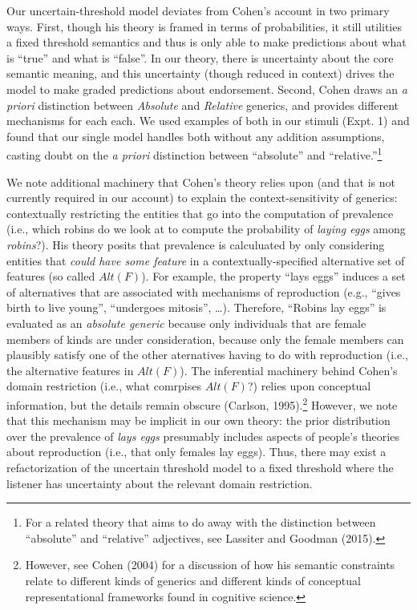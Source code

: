 \documentclass[english,floatsintext,man]{apa6}
\theoremstyle{definition}
\theoremstyle{definition}
\theoremstyle{definition}
\theoremstyle{remark}
\begin{document}
Our uncertain-threshold model deviates from Cohen's account in two
primary ways. First, though his theory is framed in terms of
probabilities, it still utilities a fixed threshold semantics and thus
is only able to make predictions about what is \enquote{true} and what
is \enquote{false}. In our theory, there is uncertainty about the core
semantic meaning, and this uncertainty (though reduced in context)
drives the model to make graded predictions about endorsement. Second,
Cohen draws an \emph{a priori} distinction between \emph{Absolute} and
\emph{Relative} generics, and provides different mechanisms for each
each. We used examples of both in our stimuli (Expt. 1) and found that
our single model handles both without any addition assumptions, casting
doubt on the \emph{a priori} distinction between \enquote{absolute} and
\enquote{relative.}\footnote{For a related theory that aims to do away
  with the distinction between \enquote{absolute} and \enquote{relative}
  adjectives, see Lassiter and Goodman (2015).}

We note additional machinery that Cohen's theory relies upon (and that
is not currently required in our account) to explain the
context-sensitivity of generics: contextually restricting the entities
that go into the computation of prevalence (i.e., which robins do we
look at to compute the probability of \emph{laying eggs} among
\emph{robins}?). His theory posits that prevalence is calculuated by
only considering entities that \emph{could have some feature} in a
contextually-specified alternative set of features (so called
\(Alt(F)\)). For example, the property \enquote{lays eggs} induces a set
of alternatives that are associated with mechanisms of reproduction
(e.g., \enquote{gives birth to live young}, \enquote{undergoes mitosis},
\ldots{}). Therefore, \enquote{Robins lay eggs} is evaluated as an
\emph{absolute generic} because only individuals that are female members
of kinds are under consideration, because only the female members can
plausibly satisfy one of the other aternatives having to do with
reproduction (i.e., the alternative features in \(Alt(F)\)). The
inferential machinery behind Cohen's domain restriction (i.e., what
comrpises \(Alt(F)\)?) relies upon conceptual information, but the
details remain obscure (Carlson, 1995).\footnote{However, see Cohen
  (2004) for a discussion of how his semantic constraints relate to
  different kinds of generics and different kinds of conceptual
  representational frameworks found in cognitive science.} However, we
note that this mechanism may be implicit in our own theory: the prior
distribution over the prevalence of \emph{lays eggs} presumably includes
aspects of people's theories about reproduction (i.e., that only females
lay eggs). Thus, there may exist a refactorization of the uncertain
threshold model to a fixed threshold where the listener has uncertainty
about the relevant domain restriction.
\end{document}
